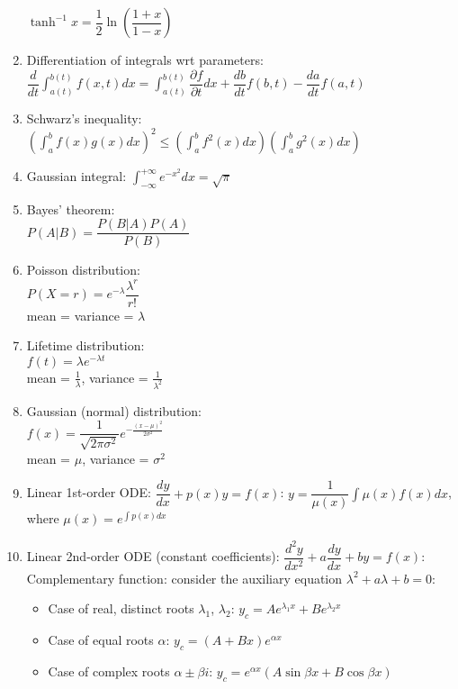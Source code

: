 \documentclass[fleqn]{article}
\begin{document}
\begin{enumerate}
        $\tanh^{-1}x=\dfrac{1}{2}\ln\left(\dfrac{1+x}{1-x}\right)$
    \item Differentiation of integrals wrt parameters:\smallbreak
        $\dfrac{d}{dt}\displaystyle\int_{a(t)}^{b(t)}f(x,t)dx=\displaystyle\int_{a(t)}^{b(t)}\dfrac{\partial f}{\partial t}dx+\dfrac{db}{dt}f(b,t)-\dfrac{da}{dt}f(a,t)$
    \item Schwarz's inequality:\smallbreak
        $\left(\displaystyle\int_a^b f(x)g(x)dx\right)^2\leq\left(\displaystyle\int_a^b f^2(x)dx\right)\left(\displaystyle\int_a^b g^2(x)dx\right)$
    \item Gaussian integral:\smallbreak
        $\displaystyle\int_{-\infty}^{+\infty}e^{-x^2}dx=\sqrt{\pi}$
    \item Bayes' theorem:\\
        $P(A|B)=\dfrac{P(B|A)P(A)}{P(B)}$
    \item Poisson distribution:\\
        $P(X=r)=e^{-\lambda}\dfrac{\lambda^r}{r!}$\\
        mean = variance = $\lambda$
    \item Lifetime distribution:\\
        $f(t)=\lambda e^{-\lambda t}$\\
        mean = $\frac{1}{\lambda}$, variance = $\frac{1}{\lambda^2}$\\
    \item Gaussian (normal) distribution:\\
        $f(x)=\dfrac{1}{\sqrt{2\pi\sigma^2}}e^{-\frac{(x-\mu)^2}{2\sigma^2}}$\\
        mean = $\mu$, variance = $\sigma^2$
    \item Linear 1st-order ODE:\smallbreak
        $\dfrac{dy}{dx}+p(x)y=f(x)$:\smallbreak
        $y=\dfrac{1}{\mu(x)}\displaystyle\int\mu(x)f(x)dx$, where $\mu(x)=e^{\int p(x)dx}$
    \item Linear 2nd-order ODE (constant coefficients):\smallbreak
        $\dfrac{d^2y}{dx^2}+a\dfrac{dy}{dx}+by=f(x)$:\smallbreak
        Complementary function: consider the auxiliary equation $\lambda^2+a\lambda+b=0$:
        \begin{itemize}[noitemsep, topsep=0pt]
            \item Case of real, distinct roots $\lambda_1$, $\lambda_2$: $y_c=Ae^{\lambda_1x}+Be^{\lambda_2x}$
            \item Case of equal roots $\alpha$: $y_c=(A+Bx)e^{\alpha x}$
            \item Case of complex roots $\alpha\pm\beta i$: $y_c=e^{\alpha x}(A\sin\beta x+B\cos\beta x)$

\end{itemize}
\end{enumerate}
\end{document}

